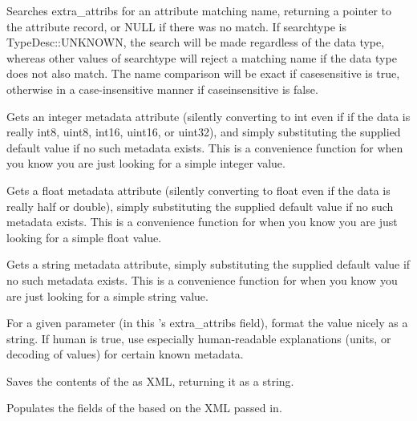 Searches {\cf extra_attribs} for an attribute matching {\cf name},
returning a pointer to the attribute record, or NULL if there was no
match.  If {\cf searchtype} is {\cf TypeDesc::UNKNOWN}, the search will be made
regardless of the data type, whereas other values of {\cf searchtype}
will reject a matching name if the data type does not also match.  The
name comparison will be exact if {\cf casesensitive} is true, otherwise
in a case-insensitive manner if {\cf caseinsensitive} is false.
\apiend

Gets an integer metadata attribute (silently converting to {\cf int}
even if if the data is really int8, uint8, int16, uint16, or uint32),
and simply substituting the supplied default value if no such metadata
exists.  This is a convenience function for when you know you are just
looking for a simple integer value.
\apiend

Gets a float metadata attribute (silently converting to {\cf float} even
if the data is really half or double), simply substituting the supplied
default value if no such metadata exists.  This is a convenience
function for when you know you are just looking for a simple float value.
\apiend

Gets a string metadata attribute, simply substituting the supplied
default value if no such metadata exists.  This is a convenience
function for when you know you are just looking for a simple string value.
\apiend


For a given parameter (in this \ImageSpec's {\cf extra_attribs} field),
format the value nicely as a string.  If {\cf human} is true, use
especially human-readable explanations (units, or decoding of
values) for certain known metadata.
\apiend


Saves the contents of the \ImageSpec as XML, returning it as a string.
\apiend

Populates the fields of the \ImageSpec based on the XML passed in.
\apiend

